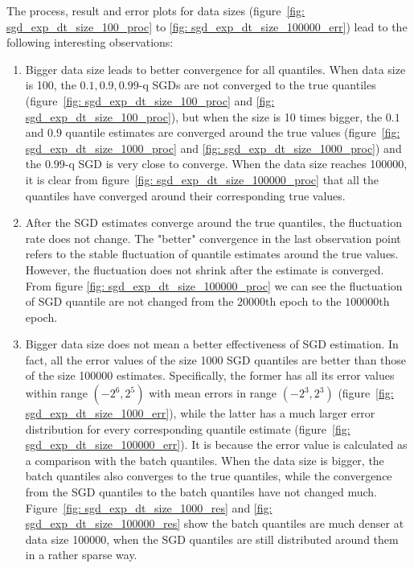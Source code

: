 The process, result and error plots for data sizes (figure~\ref{fig: sgd_exp_dt_size_100_proc} to \ref{fig: sgd_exp_dt_size_100000_err}) lead to the following interesting observations:
\begin{enumerate}
    \item Bigger data size leads to better convergence for all quantiles. When data size is 100, the $0.1, 0.9, 0.99$-q SGDs are not converged to the true quantiles (figure~\ref{fig: sgd_exp_dt_size_100_proc} and \ref{fig: sgd_exp_dt_size_100_proc}), but when the size is 10 times bigger, the $0.1$ and $0.9$ quantile estimates are converged around the true values (figure~\ref{fig: sgd_exp_dt_size_1000_proc} and \ref{fig: sgd_exp_dt_size_1000_proc}) and the $0.99$-q SGD is very close to converge. When the data size reaches 100000, it is clear from figure~\ref{fig: sgd_exp_dt_size_100000_proc} that all the quantiles have converged around their corresponding true values.
    
    \item After the SGD estimates converge around the true quantiles, the fluctuation rate does not change. The "better" convergence in the last observation point refers to the stable fluctuation of quantile estimates around the true values. However, the fluctuation does not shrink after the estimate is converged. From figure \ref{fig: sgd_exp_dt_size_100000_proc} we can see the fluctuation of SGD quantile are not changed from the $20000$th epoch to the $100000$th epoch.
    
    \item Bigger data size does not mean a better effectiveness of SGD estimation. In fact, all the error values of the size 1000 SGD quantiles are better than those of the size 100000 estimates. Specifically, the former has all its error values within range $(-2^6, 2^5)$ with mean errors in range $(-2^3, 2^3)$ (figure~\ref{fig: sgd_exp_dt_size_1000_err}), while the latter has a much larger error distribution for every corresponding quantile estimate (figure~\ref{fig: sgd_exp_dt_size_100000_err}). It is because the error value is calculated as a comparison with the batch quantiles. When the data size is bigger, the batch quantiles also converges to the true quantiles, while the convergence from the SGD quantiles to the batch quantiles have not changed much. Figure~\ref{fig: sgd_exp_dt_size_1000_res} and \ref{fig: sgd_exp_dt_size_100000_res} show the batch quantiles are much denser at data size 100000, when the SGD quantiles are still distributed around them in a rather sparse way.
\end{enumerate}
